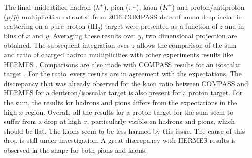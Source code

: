 The final unidentified hadron ($h^{\pm}$), pion ($\pi^{\pm}$), kaon ($K^{\pm}$) and proton/antiproton ($p/\bar{p}$) multiplicities extracted from $2016$ COMPASS data of muon deep inelastic scattering on a pure proton (lH$_2$) target were presented as a function of $z$ and in bins of $x$ and $y$. Averaging these results over $y$, two dimensional projection are obtained. The subsequent integration over $z$ allows the comparison of the sum and ratio of charged hadron multiplicities with other experiments results like HERMES \cite{HERMESMult}. Comparisons are also made with COMPASS results for an isoscalar target \cite{COMPASS2006Pi,COMPASS2006K}. For the ratio, every results are in agreement with the expectations. The discrepancy that was already observed for the kaon ratio between COMPASS and HERMES for a deuteron/isoscalar target is also present for a proton target. For the sum, the results for hadrons and pions differs from the expectations in the high $x$ region. Overall, all the results for a proton target for the sum seem to suffer from a drop at high $x$, particularly visible on hadrons and pions, which should be flat. The kaons seem to be less harmed by this issue. The cause of this drop is still under investigation. A great discrepancy with HERMES results is observed in the shape for both pions and kaons.
